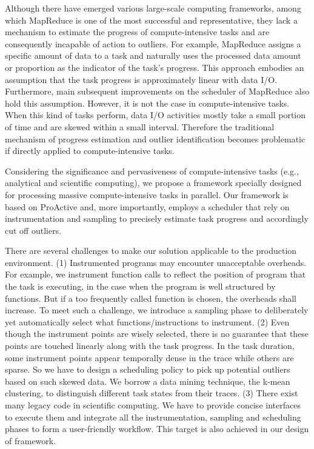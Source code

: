 Although there have emerged various large-scale computing frameworks, among which MapReduce is one of the most successful and representative, they lack a mechanism to estimate the progress of compute-intensive tasks and are consequently incapable of action to outliers. For example, MapReduce assigns a specific amount of data to a task and naturally uses the processed data amount or proportion as the indicator of the task's progress. This approach embodies an assumption that the task progress is approximately linear with data I/O. Furthermore, main subsequent improvements on the scheduler of MapReduce also hold this assumption. However, it is not the case in compute-intensive tasks. When this kind of tasks perform, data I/O activities mostly take a small portion of time and are skewed within a small interval. Therefore the traditional mechanism of progress estimation and outlier identification becomes problematic if directly applied to compute-intensive tasks.

Considering the significance and pervasiveness of compute-intensive tasks (e.g., analytical and scientific computing), we propose a framework specially designed for processing massive compute-intensive tasks in parallel. Our framework is based on ProActive and, more importantly, employs a scheduler that rely on instrumentation and sampling to precisely estimate task progress and accordingly cut off outliers.

There are several challenges to make our solution applicable to the production environment. (1) Instrumented programs may encounter unacceptable overheads. For example, we instrument function calls to reflect the position of program that the task is executing, in the case when the program is well structured by functions. But if a too frequently called function is chosen, the overheads shall increase. To meet such a challenge, we introduce a sampling phase to deliberately yet automatically select what functions/instructions to instrument. (2) Even though the instrument points are wisely selected, there is no guarantee that these points are touched linearly along with the task progress. In the task duration, some instrument points appear temporally dense in the trace while others are sparse. So we have to design a scheduling policy to pick up potential outliers based on such skewed data. We borrow a data mining technique, the k-mean clustering, to distinguish different task states from their traces. (3) There exist many legacy code in scientific computing. We have to provide concise interfaces to execute them and integrate all the instrumentation, sampling and scheduling phases to form a user-friendly workflow. This target is also achieved in our design of framework.

